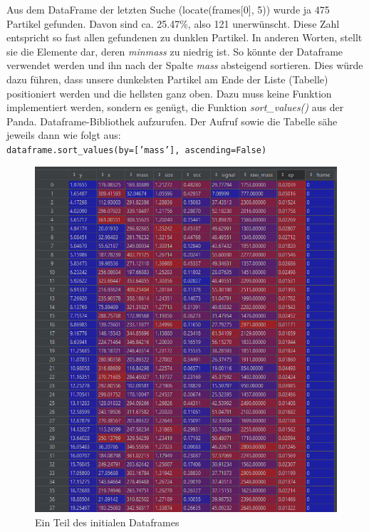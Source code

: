 \begin{enumerate}
Aus dem DataFrame der letzten Suche (locate(frames[0], 5)) wurde ja 475 Partikel gefunden. Davon sind ca. 25.47\%, also 121 unerwünscht. Diese Zahl entspricht so fast allen gefundenen zu dunklen Partikel. In anderen Worten, stellt sie die Elemente dar, deren \textit{minmass} zu niedrig ist.
So könnte der Dataframe verwendet werden und ihn nach der Spalte \textit{mass} absteigend sortieren. 
Dies würde dazu führen, dass unsere dunkelsten Partikel am Ende der Liste (Tabelle) positioniert werden und die hellsten ganz oben. Dazu muss keine Funktion implementiert werden, sondern es genügt, die Funktion \textit{sort\_values()} aus der Panda. Dataframe-Bibliothek aufzurufen. Der Aufruf sowie die Tabelle sähe jeweils dann wie folgt aus:\\ \texttt{dataframe.sort\_values(by=['mass'], ascending=False)}

\begin{figure}[H]
    \centering
    \includegraphics[scale=0.45]{Grafiken/trackpyBilder/df_initial.png}
    \caption{Ein Teil des initialen Dataframes}
    \label{fig:kap3_initDataframe}
\end{figure}


\end{enumerate}
